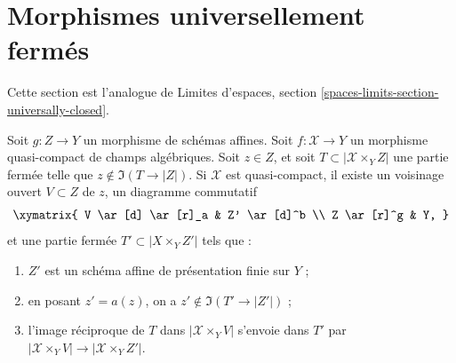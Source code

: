 \section{Morphismes universellement fermés}
\label{section-universally-closed}

\noindent
Cette section est l'analogue de Limites d'espaces, section
\ref{spaces-limits-section-universally-closed}.

\begin{lemma}
\label{lemma-separate}
Soit $g : Z \to Y$ un morphisme de schémas affines. Soit
$f : \mathcal{X} \to Y$ un morphisme quasi-compact de champs algébriques. Soit
$z \in Z$, et soit $T \subset |\mathcal{X} \times_Y Z|$ une partie fermée telle
que $z \not \in \Im(T \to |Z|)$. Si $\mathcal{X}$ est quasi-compact, il existe
un voisinage ouvert $V \subset Z$ de $z$, un diagramme commutatif
$$
\xymatrix{
V \ar[d] \ar[r]_a & Z' \ar[d]^b \\
Z \ar[r]^g & Y,
}
$$
et une partie fermée $T' \subset |X \times_Y Z'|$ tels que :
\begin{enumerate}
\item $Z'$ est un schéma affine de présentation finie sur $Y$ ;
\item en posant $z' = a(z)$, on a $z' \not \in \Im(T' \to |Z'|)$ ;
\item l'image réciproque de $T$ dans $|\mathcal{X} \times_Y V|$ s'envoie dans
$T'$ par $|\mathcal{X} \times_Y V| \to |\mathcal{X} \times_Y Z'|$.
\end{enumerate}
\end{lemma}

